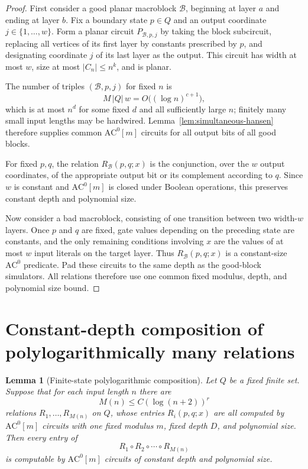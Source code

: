 \documentclass[11pt]{article}
\newtheorem{lemma}[theorem]{Lemma}
\theoremstyle{definition}
\newcommand{\ACm}[1]{\mathrm{AC}^{0}[#1]}
\newcommand{\cB}{\mathcal{B}}
\begin{document}
\begin{proof}
First consider a good planar macroblock $\cB$, beginning at layer $a$ and ending at layer $b$. Fix a boundary state $p\in Q$ and an output coordinate $j\in\{1,\ldots,w\}$. Form a planar circuit $P_{\cB,p,j}$ by taking the block subcircuit, replacing all vertices of its first layer by constants prescribed by $p$, and designating coordinate $j$ of its last layer as the output. This circuit has width at most $w$, size at most $|C_n|\le n^k$, and is planar.

The number of triples $(\cB,p,j)$ for fixed $n$ is
\[
  M\,|Q|\,w=O\bigl((\log n)^{c+1}\bigr),
\]
which is at most $n^d$ for some fixed $d$ and all sufficiently large $n$; finitely many small input lengths may be hardwired. Lemma~\ref{lem:simultaneous-hansen} therefore supplies common $\ACm{m}$ circuits for all output bits of all good blocks.

For fixed $p,q$, the relation $R_{\cB}(p,q;x)$ is the conjunction, over the $w$ output coordinates, of the appropriate output bit or its complement according to $q$. Since $w$ is constant and $\ACm{m}$ is closed under Boolean operations, this preserves constant depth and polynomial size.

Now consider a bad macroblock, consisting of one transition between two width-$w$ layers. Once $p$ and $q$ are fixed, gate values depending on the preceding state are constants, and the only remaining conditions involving $x$ are the values of at most $w$ input literals on the target layer. Thus $R_{\cB}(p,q;x)$ is a constant-size $\mathrm{AC}^0$ predicate. Pad these circuits to the same depth as the good-block simulators. All relations therefore use one common fixed modulus, depth, and polynomial size bound.
\end{proof}

\section{Constant-depth composition of polylogarithmically many relations}

\begin{lemma}[Finite-state polylogarithmic composition]\label{lem:composition}
Let $Q$ be a fixed finite set. Suppose that for each input length $n$ there are
\[
  M(n)\le C(\log(n+2))^r
\]
relations $R_1,\ldots,R_{M(n)}$ on $Q$, whose entries $R_i(p,q;x)$ are all computed by $\ACm{m}$ circuits with one fixed modulus $m$, fixed depth $D$, and polynomial size. Then every entry of
\[
  R_1\circ R_2\circ\cdots\circ R_{M(n)}
\]
is computable by $\ACm{m}$ circuits of constant depth and polynomial size.
\end{lemma}
\end{document}
